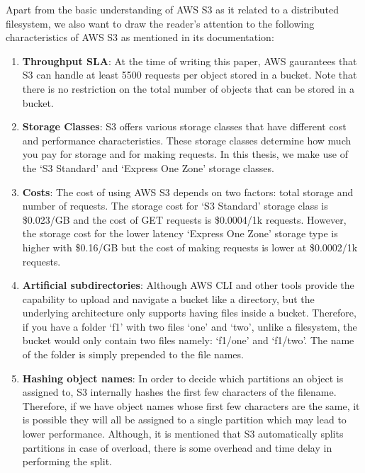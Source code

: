 \medskip
Apart from the basic understanding of AWS S3 as it related to a distributed
filesystem, we also want to draw the reader's attention to the following
characteristics of AWS S3 as mentioned in its documentation:
\begin{enumerate}
    \item \textbf{Throughput SLA}: At the time of writing this paper, AWS
        gaurantees that S3 can handle at least 5500 requests per object stored
        in a bucket. Note that there is no restriction on the total number of
        objects that can be stored in a bucket.
    \item \textbf{Storage Classes}: S3 offers various storage classes that have
        different cost and performance characteristics. These storage classes
        determine how much you pay for storage and for making requests. In this
        thesis, we make use of the `S3 Standard' and `Express One Zone' storage
        classes.
    \item \textbf{Costs}: The cost of using AWS S3 depends on two factors: total
        storage and number of requests. The storage cost for `S3 Standard'
        storage class is \$0.023/GB and the cost of GET requests is
        \$0.0004/1k requests. However, the storage cost for the lower latency
        `Express One Zone' storage type is higher with \$0.16/GB but the cost of making
        requests is lower at \$0.0002/1k requests. 
    \item \textbf{Artificial subdirectories}: Although AWS CLI and other tools
        provide the capability to upload and navigate a bucket like a directory,
        but the underlying architecture only supports having files inside a
        bucket. Therefore, if you have a folder `f1' with two files `one' and
        `two', unlike a filesystem, the bucket would only contain two files
        namely: `f1/one' and `f1/two'. The name of the folder is simply
        prepended to the file names.
    \item \textbf{Hashing object names}: In order to decide which partitions an
        object is assigned to, S3 internally hashes the first few characters of
        the filename. Therefore, if we have object names whose first few
        characters are the same, it is possible they will all be assigned to a
        single partition which may lead to lower performance. Although, it is
        mentioned that S3 automatically splits partitions in case of overload,
        there is some overhead and time delay in performing the split.
\end{enumerate}

